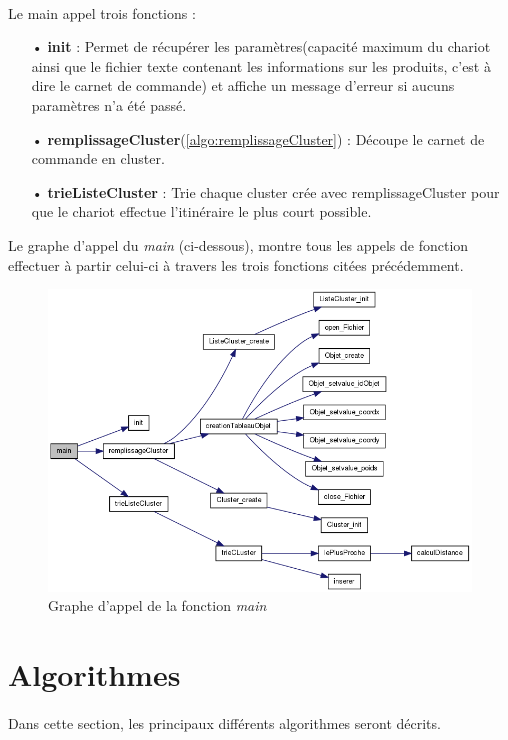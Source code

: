 \documentclass[twoside,UTF8]{EPURapport}
\begin{document}
\paragraph{}
Le main appel trois fonctions : 
\begin{itemize}
\item[•]\textbf{init} : Permet de récupérer les paramètres(capacité maximum du chariot ainsi que le fichier texte contenant les informations sur les produits, c'est à dire le carnet de commande) et affiche un message d'erreur si aucuns paramètres n'a été passé.
\item[•]\textbf{remplissageCluster}(\ref{algo:remplissageCluster}) : Découpe le carnet de commande en cluster.
\item[•]\textbf{trieListeCluster} : Trie chaque cluster crée avec remplissageCluster pour que le chariot effectue l'itinéraire le plus court possible.
\end{itemize}

Le graphe d'appel du \textit{main} (ci-dessous), montre tous les appels de fonction effectuer à partir celui-ci à travers les trois fonctions citées précédemment.

\begin{figure}[!h]
	\center
	\includegraphics[scale=0.5]{images/main_appel.png}
	\caption{Graphe d'appel de la fonction \textit{main}}
\end{figure}

\section{Algorithmes}

\paragraph{}
Dans cette section, les principaux différents algorithmes seront décrits.
\end{document}
